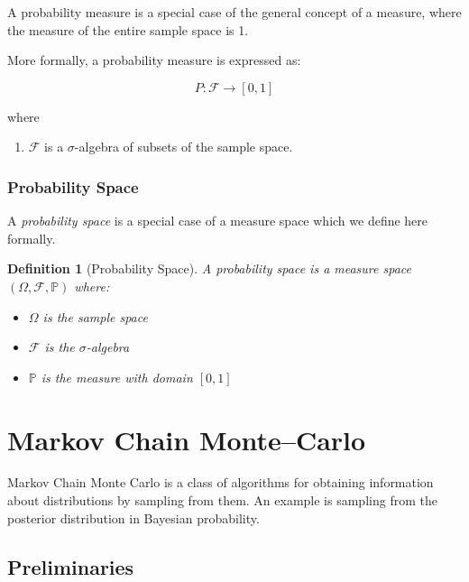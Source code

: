 \documentclass{article}
\newtheorem{definition}{Definition}
\begin{document}
A probability measure is a special case of the general concept of a measure, where the measure of the entire sample space is 1.

More formally, a probability measure is expressed as:

$$
P: \mathcal{F} \rightarrow [0,1]
$$

where 
\begin{enumerate}
    \item $\mathcal{F}$ is a $\sigma$-algebra of subsets of the sample space.
\end{enumerate}

\subsubsection{Probability Space}

A \emph{probability space} is a special case of a measure space which we define here formally.


\begin{mdframed}
\begin{definition}[Probability Space]

A \emph{probability space} is a measure space $(\Omega, \mathcal{F}, \mathbb{P} )$ where:

\begin{itemize}
    \item $\Omega$ is the sample space
    \item $\mathcal{F}$ is the $\sigma$-algebra
    \item $\mathbb{P}$ is the measure with domain $[0,1]$ 
\end{itemize}

\end{definition}
\end{mdframed}

\newpage
\section{Markov Chain Monte–Carlo}

Markov Chain Monte Carlo is a class of algorithms for obtaining information about distributions by sampling from them. An example is sampling from the posterior distribution in Bayesian probability.

\subsection{Preliminaries}
\end{document}
